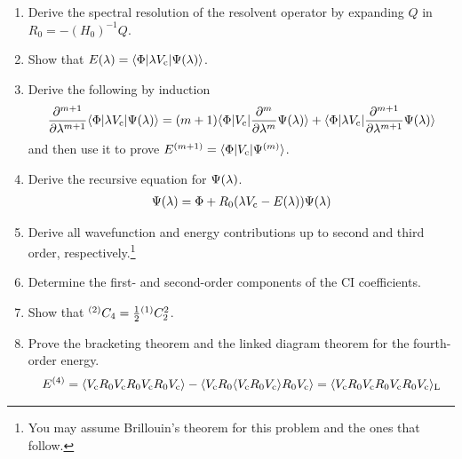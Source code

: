 \documentclass[11pt]{article}
\begin{document}
\begin{enumerate}
\item
Derive the spectral resolution of the resolvent operator by expanding $Q$ in
$
  R_0
=
-
  (H_0)^{-1}
  Q
$.


\item\label{item:energy-equation}
Show that
$
  E(\lambda )
=
  \langle\Phi |\lambda  V_{\mathrm{c}}|\Psi (\lambda )\rangle
$.

\item
Derive the following by induction
\begin{align}
  \frac {\partial^{m+1}}{\partial\lambda ^{m+1}}
  \langle\Phi |\lambda  V_{\mathrm{c}}|\Psi (\lambda )\rangle
=
  (m+1)
  \langle\Phi |V_{\mathrm{c}}|\frac {\partial^m}{\partial\lambda ^m}\Psi (\lambda )\rangle
+
  \langle\Phi |\lambda  V_{\mathrm{c}}|\frac {\partial^{m+1}}{\partial\lambda ^{m+1}}\Psi (\lambda )\rangle
\end{align}
and then use it to prove
$
  E^{(m+1)}
=
  \langle\Phi |V_{\mathrm{c}}|\Psi ^{(m)}\rangle
$.


\item\label{item:recursive-wavefunction-equation}
Derive the recursive equation for $\Psi (\lambda )$.
\begin{align}
\label{eq:recursive-wavefunction-equation}
  \Psi (\lambda )
=
  \Phi 
+
  R_0
  (
    \lambda 
    V_{\mathrm{c}}
  -
    E(\lambda )
  )
  \Psi (\lambda )
\end{align}


\item
Derive all wavefunction and energy contributions up to second and third order, respectively.\footnote{You may assume Brillouin's theorem for this problem and the ones that follow.}


\item
Determine the first- and second-order components of the CI coefficients.

\item
Show that
$
  {}^{(2)}
  C_4
=
  \tfrac{1}{2}
  {}^{(1)}
  C_2^2
$.

\item
Prove the bracketing theorem and the linked diagram theorem for the fourth-order energy.
\begin{align*}
  E^{(4)}
=
  \langle V_{\mathrm{c}}R_0V_{\mathrm{c}}R_0V_{\mathrm{c}}R_0V_{\mathrm{c}}\rangle
-
  \langle V_{\mathrm{c}}R_0\langle V_{\mathrm{c}}R_0V_{\mathrm{c}}\rangle R_0V_{\mathrm{c}}\rangle
=
  \langle V_{\mathrm{c}}R_0V_{\mathrm{c}}R_0V_{\mathrm{c}}R_0V_{\mathrm{c}}\rangle_{\mathrm{L}}
\end{align*}

\end{enumerate}
\end{document}
